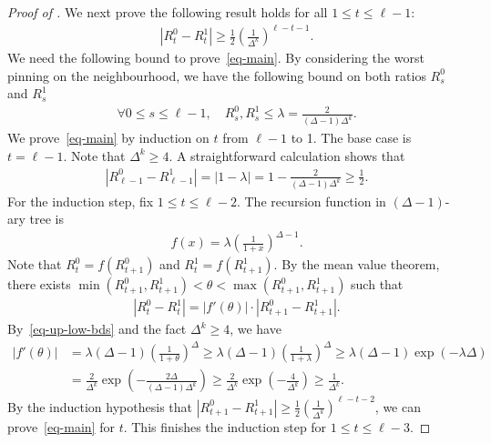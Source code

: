 \documentclass[11pt]{amsart}
\newcommand{\tp}[1]{{\left( #1 \right)}}
\newcommand{\abs}[1]{\ensuremath{\left\vert#1\right\vert}}
\theoremstyle{definition}
\theoremstyle{remark}
\begin{document}
\begin{proof}[Proof of ]
We next prove the following result holds for all $1 \leq t \leq \ell - 1$:
\begin{align}\label{eq-main}
	\abs{R^0_t  - R^1_t } \geq \frac{1}{2}\tp{\frac{1}{\Delta^k}}^{\ell  -t - 1}.
\end{align}
We need the following bound to prove~\eqref{eq-main}.
By considering the worst pinning on the neighbourhood, 
we have the following bound on both ratios $R^0_s$ and $R^1_s$
\begin{align}\label{eq-up-low-bds}
\forall 0\leq s \leq \ell - 1, \quad  R^0_s,R^1_s \leq \lambda = \frac{2}{(\Delta - 1)\Delta^{k}}.
\end{align}
We prove~\eqref{eq-main} by induction on $t$ from $\ell - 1$ to 1.
The base case is $t = \ell - 1$. 
Note that $\Delta^k \geq 4$.
A straightforward calculation shows that
\begin{align*}
	\abs{R^0_{\ell - 1} - R^1_{\ell - 1}} = \abs{ 1 - \lambda} = 1 - \frac{2}{(\Delta - 1)\Delta^{k}} \geq \frac{1}{2}.
\end{align*}
For the induction step, fix $1 \leq t \leq \ell - 2$. %
The recursion function in $(\Delta-1)$-ary tree is
\begin{align*}
	f(x) = \lambda \tp{\frac{1}{1+x}}^{\Delta - 1}.
\end{align*}
Note that $R^0_t = f(R^0_{t+1})$ and $R^1_t = f(R^1_{t+1})$. By the mean value theorem, there exists $\min(R^0_{t+1}, R^1_{t+1}) < \theta < \max(R^0_{t+1}, R^1_{t+1}) $ such that 
\begin{align*}
	\abs{R^0_t  - R^1_t } = |f'(\theta)| \cdot  \abs{R^0_{t+1} - R^1_{t+1}}. 
\end{align*}
By~\eqref{eq-up-low-bds} and the fact $\Delta^k \geq 4$, we have
\begin{align*}
	\abs{f'(\theta)} &= \lambda(\Delta - 1) \tp{\frac{1}{1+\theta}}^{\Delta} \geq \lambda(\Delta - 1)\tp{\frac{1}{1+\lambda}}^{\Delta} \geq \lambda(\Delta - 1)\exp(-\lambda\Delta)\\
	&= \frac{2}{\Delta^k} \exp \tp{ - \frac{2\Delta}{(\Delta - 1)\Delta^k} } \geq \frac{2}{\Delta^k} \exp \tp{ - \frac{4}{\Delta^k} } \geq \frac{1}{\Delta^k}.
\end{align*}
By the induction hypothesis that $\abs{R^0_{t+1} - R^1_{t+1}} \geq \frac{1}{2} (\frac{1}{\Delta^k})^{\ell - t - 2} $, we can prove~\eqref{eq-main} for $t$. This finishes the induction step for $1 \leq t \leq \ell - 3$.


\end{proof}
\end{document}
